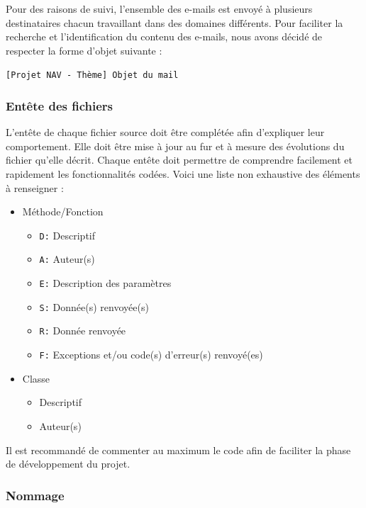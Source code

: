 \documentclass[10pt,a4paper]{article}
\begin{document}
Pour des raisons de suivi, l'ensemble des e-mails est envoyé à plusieurs destinataires chacun travaillant dans des domaines différents. Pour faciliter la recherche et l'identification du contenu des e-mails, nous avons décidé de respecter la forme d'objet suivante : 

\verb|[Projet NAV - Thème] Objet du mail|

\subsubsection{Entête des fichiers}
L'entête de chaque fichier source doit être complétée afin d'expliquer leur comportement. Elle doit être mise à jour au fur et à mesure des évolutions du fichier qu'elle décrit.
Chaque entête doit permettre de comprendre facilement et rapidement les fonctionnalités codées.
Voici une liste non exhaustive des éléments à renseigner :
\begin{itemize}
\item Méthode/Fonction
\begin{itemize} 
	\renewcommand{\labelitemii}{$\cdot$}
	\item \verb|D:| Descriptif
	\item \verb|A:| Auteur(s)
	\item \verb|E:| Description des paramètres
	\item \verb|S:| Donnée(s) renvoyée(s)
	\item \verb|R:| Donnée renvoyée
	\item \verb|F:| Exceptions et/ou code(s) d'erreur(s) renvoyé(es)
\end{itemize}
\item Classe
\begin{itemize} 
	\renewcommand{\labelitemii}{$\cdot$} 
	\item Descriptif
	\item Auteur(s)
\end{itemize}
\end{itemize}

Il est recommandé de commenter au maximum le code afin de faciliter la phase de développement du projet.

\subsubsection{Nommage}
\end{document}
